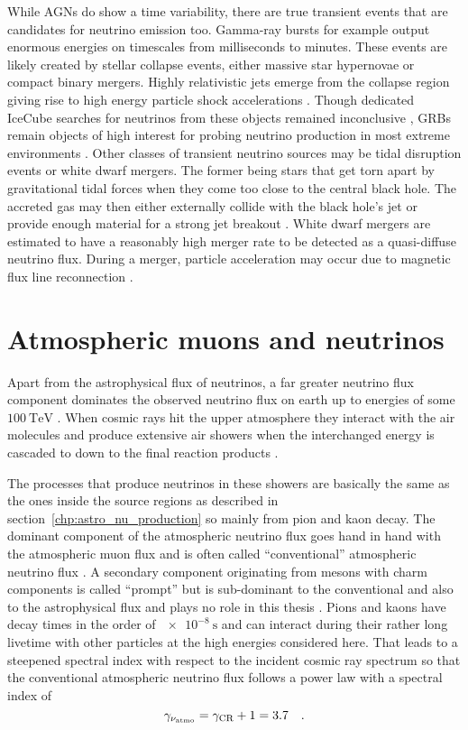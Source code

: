 While AGNs do show a time variability, there are true transient events that are candidates for neutrino emission too.
Gamma-ray bursts for example output enormous energies on timescales from milliseconds to minutes.
These events are likely created by stellar collapse events, either massive star hypernovae or compact binary mergers.
Highly relativistic jets emerge from the collapse region giving rise to high energy particle shock accelerations \cite{Bianco:2007fe}.
Though dedicated IceCube searches for neutrinos from these objects remained inconclusive \cite{Aartsen:2016qcr,Abbasi:2010grb}, GRBs remain objects of high interest for probing neutrino production in most extreme environments \cite{Senno:2016grb}.
Other classes of transient neutrino sources may be tidal disruption events or white dwarf mergers.
The former being stars that get torn apart by gravitational tidal forces when they come too close to the central black hole.
The accreted gas may then either externally collide with the black hole's jet or provide enough material for a strong jet breakout \cite{Mattila:2018gsg}.
White dwarf mergers are estimated to have a reasonably high merger rate to be detected as a quasi-diffuse neutrino flux.
During a merger, particle acceleration may occur due to magnetic flux line reconnection \cite{Xiao:2016man}.


\section{Atmospheric muons and neutrinos}
Apart from the astrophysical flux of neutrinos, a far greater neutrino flux component dominates the observed neutrino flux on earth up to energies of some $\SI{100}{\TeV}$ \cite{Engberg:2008prompt,Gaisser:2002jj}.
When cosmic rays hit the upper atmosphere they interact with the air molecules and produce extensive air showers when the interchanged energy is cascaded to down to the final reaction products \cite{Gaisser:2016uoy}.

The processes that produce neutrinos in these showers are basically the same as the ones inside the source regions as described in section~\ref{chp:astro_nu_production} so mainly from pion and kaon decay.
The dominant component of the atmospheric neutrino flux goes hand in hand with the atmospheric muon flux and is often called \enquote{conventional} atmospheric neutrino flux \cite{Gaisser:2002jj,Gondolo:1995fq}.
A secondary component originating from mesons with charm components is called \enquote{prompt} but is sub-dominant to the conventional and also to the astrophysical flux and plays no role in this thesis \cite{Engberg:2008prompt,Haack:2017dxi}.
Pions and kaons have decay times in the order of $\SI{e-8}{\s}$ and can interact during their rather long livetime with other particles at the high energies considered here.
That leads to a steepened spectral index with respect to the incident cosmic ray spectrum so that the conventional atmospheric neutrino flux follows a power law with a spectral index of \cite{Gondolo:1995fq}
\begin{equation}
  \gamma_{\nu_\text{atmo}} = \gamma_\text{CR} + 1 = 3.7
  \quad\text{.}
\end{equation}